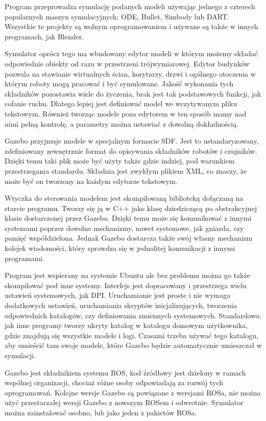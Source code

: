 	Program przeprowadza symulację podanych modeli używając jednego z czterech popularnych maszyn symulacyjnych: ODE, Bullet, Simbody lub DART.
	Wszystkie te projekty są wolnym oprogramowaniem i używane są także w innych programach, jak Blender.

	Symulator oprócz tego ma wbudowany edytor modeli w którym możemy składać odpowiednie obiekty od razu w przestrzeni trójwymiarowej.
	Edytor budynków pozwala na stawianie wirtualnych ścian, korytarzy, drzwi i ogólnego otoczenia w którym roboty mogą pracować i być symulowane.
	Jakość wykonania tych składników pozostawia wiele do życzenia, brak jest tak podstawowych funkcji, jak cofanie ruchu.
	Dlatego lepiej jest definiować model we wczytywanym pliku tekstowym.
	Również tworząc modele poza edytorem w ten sposób mamy nad nimi pełną kontrolę, a parametry można ustawiać z dowolną dokładnością.

	Gazebo przyjmuje modele w specjalnym formacie SDF. Jest to ustandaryzowany, zdefiniowany zewnętrznie format do opisywania składników robotów i czujników.
	Dzięki temu taki plik może być użyty także gdzie indziej, pod warunkiem przestrzegania standardu.
	Składnia jest zwykłym plikiem XML, co znaczy, że może być on tworzony na każdym edytorze tekstowym.

	Wtyczka do sterowania modelem jest skompilowaną biblioteką dołączaną na starcie programu.
	Tworzy się ją w C++ jako klasę dziedziczącą po abstrakcyjnej klasie dostarczonej przez Gazebo.
	Dzięki temu może się komunikować z innymi systemami poprzez dowolne mechanizmy, nawet systemowe, jak gniazda, czy pamięć współdzielona.
	Jednak Gazebo dostarcza także swój własny mechanizm kolejek wiadomości, który sprawdza się w jednolitej komunikacji z innymi programami.

	Program jest wspierany na systemie Ubuntu ale bez problemu można go także skompilować pod inne systemy.
	Interfejs jest dopracowany i przestrzega wielu ustawień systemowych, jak DPI.
	Uruchamianie jest proste i nie wymaga dodatkowych ustawień, uruchamiania skryptów inicjalizujących, tworzenia odpowiednich katalogów, czy definiowania zmiennych systemowych.
	Standardowo, jak inne programy tworzy ukryty katalog w katalogu domowym użytkownika, gdzie znajdują się wszystkie modele i logi.
	Czasami trzeba używać tego katalogu, aby umieścić tam swoje modele, które Gazebo będzie automatycznie umieszczał w symulacji.

	Gazebo jest składnikiem systemu ROS, kod źródłowy jest dzielony w ramach wspólnej organizacji, chociaż różne osoby odpowiadają za rozwój tych oprogramowań.
	Kolejne wersje Gazebo są powiązane z wersjami ROSa, nie można użyć przestarzałej wersji Gazebo z nowszym ROSem i odwrotnie.
	Symulator można zainstalować osobno, lub jako jeden z pakietów ROSa.

